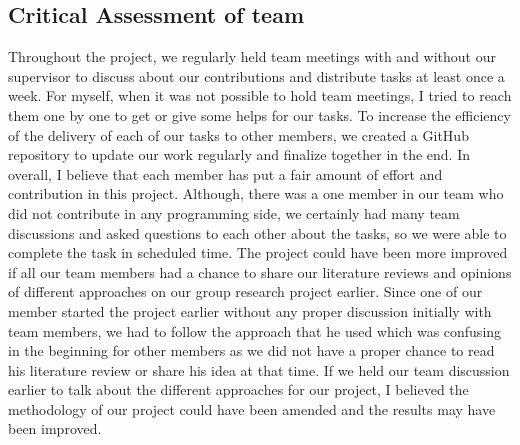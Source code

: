 \documentclass[conference]{IEEEtran}
\begin{document}
\subsection{Critical Assessment of team}
Throughout the project, we regularly held team meetings with and without our supervisor to discuss about our contributions and distribute tasks at least once a week. For myself, when it was not possible to hold team meetings, I tried to reach them one by one to get or give some helps for our tasks. To increase the efficiency of the delivery of each of our tasks to other members, we created a GitHub repository to update our work regularly and finalize together in the end. In overall, I believe that each member has put a fair amount of effort and contribution in this project. Although, there was a one member in our team who did not contribute in any programming side, we certainly had many team discussions and asked questions to each other about the tasks, so we were able to complete the task in scheduled time. The project could have been more improved if all our team members had a chance to share our literature reviews and opinions of different approaches on our group research project earlier. Since one of our member started the project earlier without any proper discussion initially with team members, we had to follow the approach that he used which was confusing in the beginning for other members as we did not have a proper chance to read his literature review or share his idea at that time. If we held our team discussion earlier to talk about the different approaches for our project, I believed the methodology of our project could have been amended and the results may have been improved.
\end{document}

